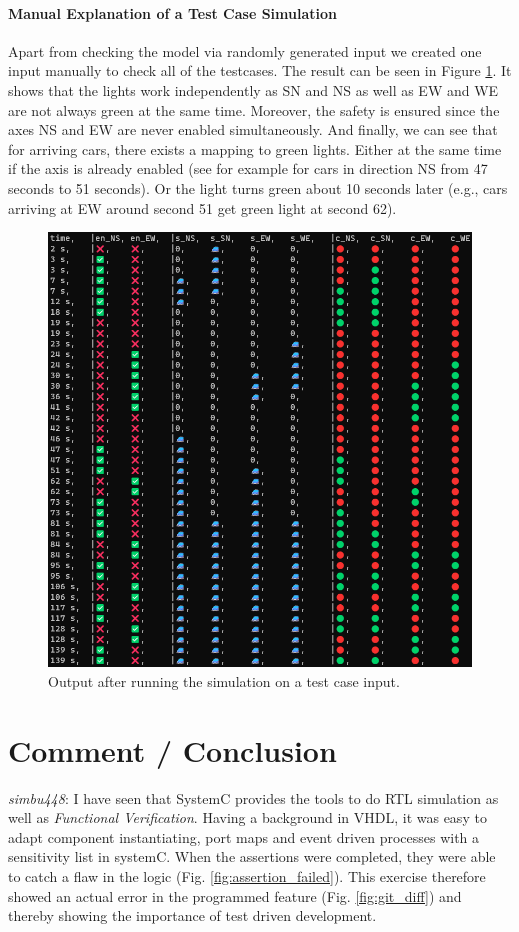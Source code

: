 \documentclass[10pt,bibliography=totocnumbered,listof=totocnumbered, footsepline, headsepline]{scrreprt}
\begin{document}
    \paragraph*{Manual Explanation of a Test Case Simulation}
    Apart from checking the model via randomly generated input we created one input manually to check all of the testcases. The result can be seen in Figure \ref{fig:testcase_traffic}. It shows that the lights work independently as SN and NS as well as EW and WE are not always green at the same time. Moreover, the safety is ensured since the axes NS and EW are never enabled simultaneously. And finally, we can see that for arriving cars, there exists a mapping to green lights. Either at the same time if the axis is already enabled (see for example for cars in direction NS from 47 seconds to 51 seconds). Or the light turns green about 10 seconds later (e.g., cars arriving at EW around second 51 get green light at second 62).
    \begin{figure}[H]
    	\centerline{\includegraphics[width=34pc]{myTestcase_Output.png}}
    	\caption{Output after running the simulation on a test case input.}
    	\label{fig:testcase_traffic}
    \end{figure}
    


\section{Comment / Conclusion}
\textit{simbu448}: I have seen that SystemC provides the tools to do RTL simulation as well as \textit{Functional Verification}. Having a background in VHDL, it was easy to adapt component instantiating, port maps and event driven processes with a sensitivity list in systemC.
When the assertions were completed, they were able to catch a flaw in the logic (Fig. \ref{fig:assertion_failed}). 
This exercise therefore showed an actual error in the programmed feature (Fig. \ref{fig:git_diff}) and thereby showing the importance of test driven development.
    
\end{document}
